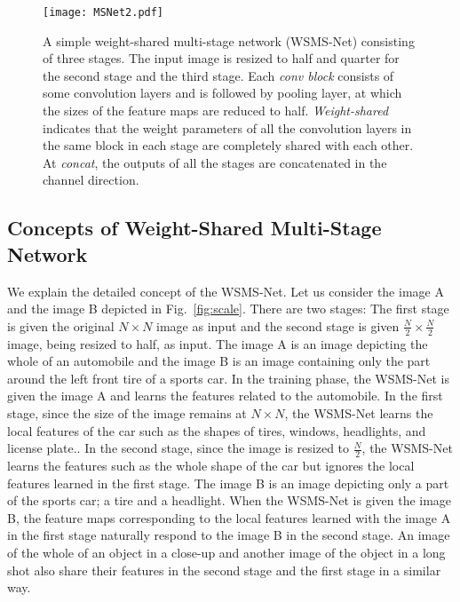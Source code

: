 \documentclass[journal]{IEEEtran}
\begin{document}
\begin{figure}[!t]
\centering
\texttt{[image: MSNet2.pdf]}
\caption{A simple weight-shared multi-stage network (WSMS-Net) consisting of three stages.
The input image is resized to half and quarter for the second stage and the third stage.
Each \emph{conv block} consists of some convolution layers and is followed by pooling layer, at which the sizes of the feature maps are reduced to half.
\emph{Weight-shared} indicates that the weight parameters of all the convolution layers in the same block in each stage are completely shared with each other.
At \emph{concat}, the outputs of all the stages are concatenated in the channel direction.}
\label{fig:MSNet_related_work}
\end{figure}

\subsection{Concepts of Weight-Shared Multi-Stage Network}
We explain the detailed concept of the WSMS-Net.
Let us consider the image A and the image B depicted in Fig.~\ref{fig:scale}.
There are two stages: The first stage is given the original $N \times N$ image as input and the second stage is given $\frac{N}{2}\times\frac{N}{2}$ image, being resized to half, as input.
The image A is an image depicting the whole of an automobile and the image B is an image containing only the part around the left front tire of a sports car.
In the training phase, the WSMS-Net is given the image A and learns the features related to the automobile.
In the first stage, since the size of the image remains at $N\times N$, the WSMS-Net learns the local features of the car such as the shapes of tires, windows, headlights, and license plate..
In the second stage, since the image is resized to $\frac{N}{2}$, the WSMS-Net learns the features such as the whole shape of the car but ignores the local features learned in the first stage.
The image B is an image depicting only a part of the sports car; a tire and a headlight.
When the WSMS-Net is given the image B, the feature maps corresponding to the local features learned with the image A in the first stage naturally respond to the image B in the second stage.
An image of the whole of an object in a close-up and another image of the object in a long shot also share their features in the second stage and the first stage in a similar way.
\end{document}
